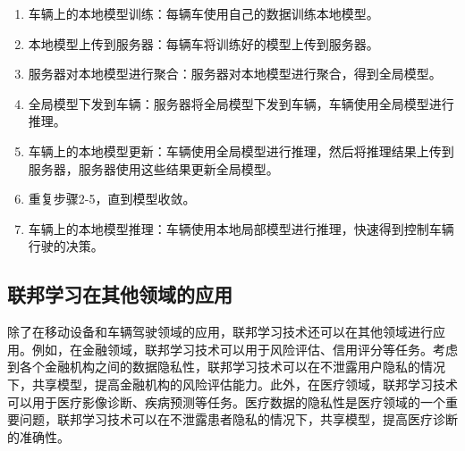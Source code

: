 \begin{enumerate}
    \item 车辆上的本地模型训练：每辆车使用自己的数据训练本地模型。
    \item 本地模型上传到服务器：每辆车将训练好的模型上传到服务器。
    \item 服务器对本地模型进行聚合：服务器对本地模型进行聚合，得到全局模型。
    \item 全局模型下发到车辆：服务器将全局模型下发到车辆，车辆使用全局模型进行推理。
    \item 车辆上的本地模型更新：车辆使用全局模型进行推理，然后将推理结果上传到服务器，服务器使用这些结果更新全局模型。
    \item 重复步骤2-5，直到模型收敛。
    \item 车辆上的本地模型推理：车辆使用本地局部模型进行推理，快速得到控制车辆行驶的决策。
\end{enumerate}

\subsection{联邦学习在其他领域的应用}

除了在移动设备和车辆驾驶领域的应用，联邦学习技术还可以在其他领域进行应用。例如，在金融领域，联邦学习技术可以用于风险评估、信用评分等任务。考虑到各个金融机构之间的数据隐私性，联邦学习技术可以在不泄露用户隐私的情况下，共享模型，提高金融机构的风险评估能力\cite{saputra2020federated}。此外，在医疗领域，联邦学习技术可以用于医疗影像诊断、疾病预测等任务。医疗数据的隐私性是医疗领域的一个重要问题，联邦学习技术可以在不泄露患者隐私的情况下，共享模型，提高医疗诊断的准确性\cite{sheller2020federated}。